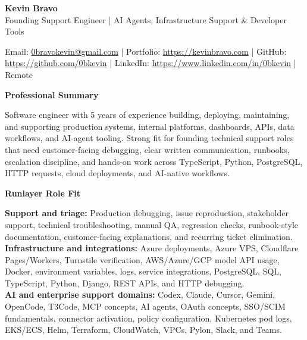 \documentclass[10pt]{article}
\begin{document}
\raggedright

\begin{center}
    {\LARGE \textbf{Kevin Bravo}}\\
    Founding Support Engineer | AI Agents, Infrastructure Support \& Developer Tools \\
    \hrulefill
\end{center}

\begin{center}
    Email: \href{mailto:0bravokevin@gmail.com}{0bravokevin@gmail.com}
    | Portfolio: \href{https://kevinbravo.com}{https://kevinbravo.com}
    | GitHub: \href{https://github.com/0bkevin}{https://github.com/0bkevin}
    | LinkedIn: \href{https://www.linkedin.com/in/0bkevin/}{https://www.linkedin.com/in/0bkevin}
    | Remote
\end{center}

\vspace{2pt}
\begin{center}
    \textbf{Professional Summary}
\end{center}
\vspace{-6pt}
Software engineer with 5 years of experience building, deploying, maintaining, and supporting production systems, internal platforms, dashboards, APIs, data workflows, and AI-agent tooling. Strong fit for founding technical support roles that need customer-facing debugging, clear written communication, runbooks, escalation discipline, and hands-on work across TypeScript, Python, PostgreSQL, HTTP requests, cloud deployments, and AI-native workflows.

\vspace{3pt}
\begin{center}
    \textbf{Runlayer Role Fit}
\end{center}
\vspace{-6pt}
\textbf{Support and triage:} Production debugging, issue reproduction, stakeholder support, technical troubleshooting, manual QA, regression checks, runbook-style documentation, customer-facing explanations, and recurring ticket elimination. \\
\textbf{Infrastructure and integrations:} Azure deployments, Azure VPS, Cloudflare Pages/Workers, Turnstile verification, AWS/Azure/GCP model API usage, Docker, environment variables, logs, service integrations, PostgreSQL, SQL, TypeScript, Python, Django, REST APIs, and HTTP debugging. \\
\textbf{AI and enterprise support domains:} Codex, Claude, Cursor, Gemini, OpenCode, T3Code, MCP concepts, AI agents, OAuth concepts, SSO/SCIM fundamentals, connector activation, policy configuration, Kubernetes pod logs, EKS/ECS, Helm, Terraform, CloudWatch, VPCs, Pylon, Slack, and Teams.
\end{document}
